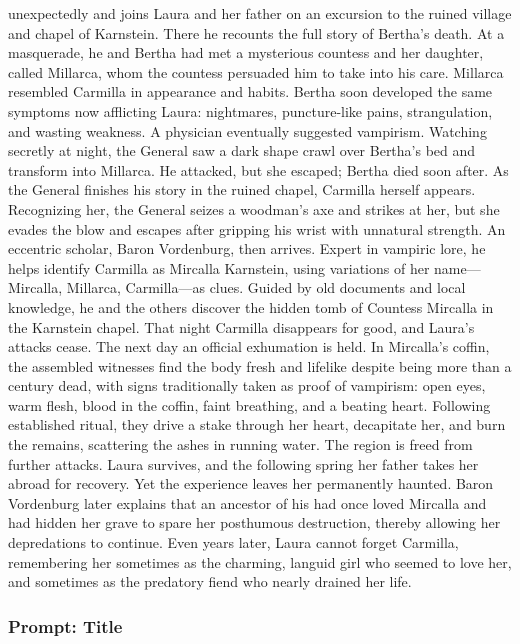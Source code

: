 \documentclass{article} %
\begin{document}
unexpectedly and joins Laura and her father on an excursion to the ruined village and chapel of Karnstein. There he recounts the full story of Bertha’s death. At a masquerade, he and Bertha had met a mysterious countess and her daughter, called Millarca, whom the countess persuaded him to take into his care. Millarca resembled Carmilla in appearance and habits. Bertha soon developed the same symptoms now afflicting Laura: nightmares, puncture-like pains, strangulation, and wasting weakness. A physician eventually suggested vampirism. Watching secretly at night, the General saw a dark shape crawl over Bertha’s bed and transform into Millarca. He attacked, but she escaped; Bertha died soon after. As the General finishes his story in the ruined chapel, Carmilla herself appears. Recognizing her, the General seizes a woodman’s axe and strikes at her, but she evades the blow and escapes after gripping his wrist with unnatural strength. An eccentric scholar, Baron Vordenburg, then arrives. Expert in vampiric lore, he helps identify Carmilla as Mircalla Karnstein, using variations of her name—Mircalla, Millarca, Carmilla—as clues. Guided by old documents and local knowledge, he and the others discover the hidden tomb of Countess Mircalla in the Karnstein chapel. That night Carmilla disappears for good, and Laura’s attacks cease. The next day an official exhumation is held. In Mircalla’s coffin, the assembled witnesses find the body fresh and lifelike despite being more than a century dead, with signs traditionally taken as proof of vampirism: open eyes, warm flesh, blood in the coffin, faint breathing, and a beating heart. Following established ritual, they drive a stake through her heart, decapitate her, and burn the remains, scattering the ashes in running water. The region is freed from further attacks. Laura survives, and the following spring her father takes her abroad for recovery. Yet the experience leaves her permanently haunted. Baron Vordenburg later explains that an ancestor of his had once loved Mircalla and had hidden her grave to spare her posthumous destruction, thereby allowing her depredations to continue. Even years later, Laura cannot forget Carmilla, remembering her sometimes as the charming, languid girl who seemed to love her, and sometimes as the predatory fiend who nearly drained her life.

\subsubsection{Prompt: Title}
\end{document}
